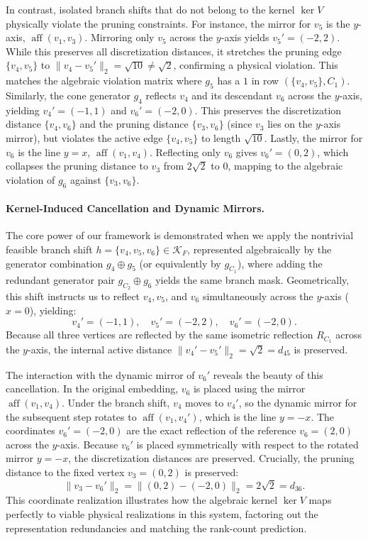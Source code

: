 \documentclass[11pt]{article}
\theoremstyle{plain}
\theoremstyle{definition}
\begin{document}
In contrast, isolated branch shifts that do not belong to the kernel $\ker V$ physically violate the pruning constraints. For instance, the mirror for $v_5$ is the $y$-axis, $\operatorname{aff}(v_1, v_3)$. Mirroring only $v_5$ across the $y$-axis yields $v_5' = (-2, 2)$. While this preserves all discretization distances, it stretches the pruning edge $\{v_4, v_5\}$ to $\|v_4 - v_5'\|_2 = \sqrt{10} \ne \sqrt{2}$, confirming a physical violation. This matches the algebraic violation matrix where $g_5$ has a $1$ in row $(\{v_4,v_5\}, C_1)$. Similarly, the cone generator $g_4$ reflects $v_4$ and its descendant $v_6$ across the $y$-axis, yielding $v_4' = (-1,1)$ and $v_6' = (-2,0)$. This preserves the discretization distance $\{v_4, v_6\}$ and the pruning distance $\{v_3, v_6\}$ (since $v_3$ lies on the $y$-axis mirror), but violates the active edge $\{v_4, v_5\}$ to length $\sqrt{10}$. Lastly, the mirror for $v_6$ is the line $y=x$, $\operatorname{aff}(v_1, v_4)$. Reflecting only $v_6$ gives $v_6' = (0,2)$, which collapses the pruning distance to $v_3$ from $2\sqrt{2}$ to $0$, mapping to the algebraic violation of $g_6$ against $\{v_3,v_6\}$.

\paragraph{Kernel-Induced Cancellation and Dynamic Mirrors.}
The core power of our framework is demonstrated when we apply the nontrivial feasible branch shift $h = \{v_4, v_5, v_6\} \in \mathcal{K}_F$, represented algebraically by the generator combination $g_4 \oplus g_5$ (or equivalently by $g_{C_1}$), where adding the redundant generator pair $g_{C_2} \oplus g_6$ yields the same branch mask. Geometrically, this shift instructs us to reflect $v_4, v_5$, and $v_6$ simultaneously across the $y$-axis ($x=0$), yielding:
\[
v_4' = (-1, 1), \quad v_5' = (-2, 2), \quad v_6' = (-2, 0).
\]
Because all three vertices are reflected by the same isometric reflection $R_{C_1}$ across the $y$-axis, the internal active distance $\|v_4' - v_5'\|_2 = \sqrt{2} = d_{45}$ is preserved. 

The interaction with the dynamic mirror of $v_6'$ reveals the beauty of this cancellation. In the original embedding, $v_6$ is placed using the mirror $\operatorname{aff}(v_1, v_4)$. Under the branch shift, $v_4$ moves to $v_4'$, so the dynamic mirror for the subsequent step rotates to $\operatorname{aff}(v_1, v_4')$, which is the line $y = -x$. The coordinates $v_6' = (-2,0)$ are the exact reflection of the reference $v_6 = (2,0)$ across the $y$-axis. Because $v_6'$ is placed symmetrically with respect to the rotated mirror $y = -x$, the discretization distances are preserved. Crucially, the pruning distance to the fixed vertex $v_3 = (0,2)$ is preserved:
\[
\|v_3 - v_6'\|_2 = \|(0,2) - (-2,0)\|_2 = 2\sqrt{2} = d_{36}.
\]
This coordinate realization illustrates how the algebraic kernel $\ker V$ maps perfectly to viable physical realizations in this system, factoring out the representation redundancies and matching the rank-count prediction.
\end{document}
